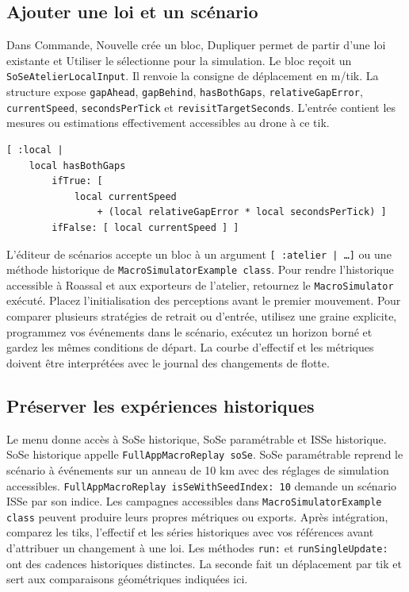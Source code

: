 \documentclass[11pt,a4paper]{article}
\newcommand{\sel}[1]{\texttt{#1}}
\newcommand{\ui}[1]{\textsf{#1}}
\begin{document}
\subsection{Ajouter une loi et un scénario}
Dans \ui{Commande}, \ui{Nouvelle} crée un bloc, \ui{Dupliquer} permet de partir d'une loi existante et \ui{Utiliser} le sélectionne pour la simulation. Le bloc reçoit un \sel{SoSeAtelierLocalInput}. Il renvoie la consigne de déplacement en m/tik. La structure expose \sel{gapAhead}, \sel{gapBehind}, \sel{hasBothGaps}, \sel{relativeGapError}, \sel{currentSpeed}, \sel{secondsPerTick} et \sel{revisitTargetSeconds}. L'entrée contient les mesures ou estimations effectivement accessibles au drone à ce tik.

\begin{lstlisting}
[ :local |
    local hasBothGaps
        ifTrue: [
            local currentSpeed
                + (local relativeGapError * local secondsPerTick) ]
        ifFalse: [ local currentSpeed ] ]
\end{lstlisting}

L'éditeur de scénarios accepte un bloc à un argument \sel{[ :atelier | \ldots ]} ou une méthode historique de \sel{MacroSimulatorExample class}. Pour rendre l'historique accessible à Roassal et aux exporteurs de l'atelier, retournez le \sel{MacroSimulator} exécuté. Placez l'initialisation des perceptions avant le premier mouvement. Pour comparer plusieurs stratégies de retrait ou d'entrée, utilisez une graine explicite, programmez vos événements dans le scénario, exécutez un horizon borné et gardez les mêmes conditions de départ. La courbe d'effectif et les métriques doivent être interprétées avec le journal des changements de flotte.

\subsection{Préserver les expériences historiques}
Le menu donne accès à \ui{SoSe historique}, \ui{SoSe paramétrable} et \ui{ISSe historique}. \ui{SoSe historique} appelle \sel{FullAppMacroReplay soSe}. \ui{SoSe paramétrable} reprend le scénario à événements sur un anneau de 10 km avec des réglages de simulation accessibles. \sel{FullAppMacroReplay isSeWithSeedIndex: 10} demande un scénario ISSe par son indice. Les campagnes accessibles dans \sel{MacroSimulatorExample class} peuvent produire leurs propres métriques ou exports. Après intégration, comparez les tiks, l'effectif et les séries historiques avec vos références avant d'attribuer un changement à une loi. Les méthodes \sel{run:} et \sel{runSingleUpdate:} ont des cadences historiques distinctes. La seconde fait un déplacement par tik et sert aux comparaisons géométriques indiquées ici.
\end{document}
